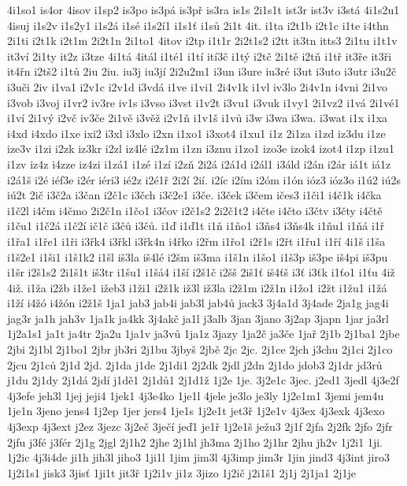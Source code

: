 {4i1so1
is4or
4isov
i1sp2
is3po
is3pá
is3př
is3ra
is1s
2i1s1t
ist3r
ist3v
i3stá
4i1s2u1
4isuj
i1s2v
i1s2y1
i1s2á
i1sé
i1s2í1
i1s1ť
i1sů
2i1t
4it.
i1ta
i2t1b
i2t1c
i1te
i4thn
2i1ti
i2t1k
i2t1m
2i2t1n
2i1to1
4itov
i2tp
i1t1r
2i2t1s2
i2tt
it3tn
itts3
2i1tu
i1t1v
it3ví
2i1ty
it2z
i3tze
4i1tá
4itál
i1té1
i1tí
ití3č
i1tý
i2tč
2i1tě
i2tň
i1tř
it3ře
it3ři
it4řn
i2tš2
i1tů
2iu
2iu.
iu3j
iu3jí
2i2u2m1
i3un
i3ure
iu3ré
i3ut
i3uto
i3utr
i3u2č
i3uči
2iv
i1va1
i2v1c
i2v1d
i3vdá
i1ve
i1vi1
2i4v1k
i1vl
iv3lo
2i4v1n
i4vni
2i1vo
i3vob
i3voj
i1vr2
iv3re
iv1s
i3vso
i3vst
i1v2t
i3vu1
i3vuk
i1vy1
2i1vz2
i1vá
2i1vé1
i1ví
2i1vý
i2vč
iv3če
2i1vě
i3věž
i2v1ň
i1v1š
i1vů
i3w
i3wa
i3wa.
i3wat
i1x
i1xa
i4xd
i4xdo
i1xe
ixi2
i3xl
i3xlo
i2xn
i1xo1
i3xot4
i1xu1
i1z
2i1za
i1zd
iz3du
i1ze
ize3v
i1zi
i2zk
iz3kr
i2zl
iz4lé
i2z1m
i1zn
i3znu
i1zo1
izo3e
izok4
izot4
i1zp
i1zu1
i1zv
iz4z
i4zze
iz4zi
i1zá1
i1zé
i1zí
i2zň
2i2á
i2á1d
i2ál1
i3áld
i2án
i2ár
iá1t
iá1z
i2á1š
i2é
iéf3e
i2ér
iéri3
ié2z
i2é1ř
2i2í
2ií.
i2íc
i2ím
i2óm
i1ón
ióz3
ióz3o
i1ú2
iú2s
iú2t
2ič
i3č2a
i3čan
i2č1c
i3čch
i3č2e1
i3če.
i3ček
i3čem
ičes3
i1či1
i4č1k
i4čka
i1č2l
i4čm
i4čmo
2i2č1n
i1čo1
i3čov
i2č1s2
2i2č1t2
i4čte
i4čto
i3čtv
i3čty
i4čtě
i1ču1
i1č2á
i1č2í
ič1č
i3čů
i3čů.
i1ď
i1ď1t
i1ň
i1ňo1
i3ňs4
i3ňs4k
i1ňu1
i1ňá
i1ř
i1řa1
i1ře1
i1ři
i3řk4
i3řkl
i3řk4n
i4řko
i2řm
i1řo1
i2ř1s
i2řt
i1řu1
i1ří
4i1š
i1ša
i1š2e1
i1ši1
i1š1k2
i1šl
iš3la
iš4lé
i2šm
iš3ma
i1š1n
i1šo1
i1š3p
iš3pe
iš4pi
iš3pu
i1šr
i2š1s2
2i1š1t
iš3tr
i1šu1
i1šá4
i1ší
i2š1č
i2šš
2iš1ť
iš4ťš
i3ť
i3ťk
i1ťo1
i1ťu
4iž
4iž.
i1ža
i2žb
i1že1
ižeb3
i1ži1
i2ž1k
iž3l
iž3la
i2ž1m
i2ž1n
i1žo1
i2žt
i1žu1
i1žá
i1ží
i4žó
i4žón
i2ž1š
1ja1
jab3
jab4i
jab3l
jab4ů
jack3
3j4a1d
3j4ade
2ja1g
jag4i
jag3r
ja1h
jah3v
1ja1k
ja4kk
3j4akč
ja1l
j3alb
3jan
3jano
3j2ap
3japn
1jar
ja3rl
1j2a1s1
ja1t
ja4tr
2ja2u
1ja1v
ja3vů
1ja1z
3jazy
1ja2č
ja3če
1jař
2j1b
2j1ba1
2jbe
2jbi
2j1bl
2j1bo1
2jbr
jb3ri
2j1bu
3jbyš
2jbě
2jc
2jc.
2j1ce
2jch
j3chu
2j1ci
2j1co
2jcu
2j1ců
2j1d
2jd.
2j1da
j1de
2j1di1
2j2dk
2jdl
j2dn
2j1do
jdob3
2j1dr
jd3rů
j1du
2j1dy
2j1dá
2jdí
j1dě1
2j1dů1
2j1d1ž
1j2e
1je.
3j2e1c
3jec.
j2ed1
3jedl
4j3e2f
4j3efe
jeh3l
1jej
jeji4
1jek1
4j3e4ko
1je1l
4jele
je3lo
je3ly
1j2e1m1
3jemi
jem4u
1je1n
3jeno
jens4
1j2ep
1jer
jers4
1je1s
1j2e1t
jet3ř
1j2e1v
4j3ex
4j3exk
4j3exo
4j3exp
4j3ext
j2ez
3jezc
3j2eč
3ječí
jeď1
je1ř
1j2e1š
ježu3
2j1f
2jfa
2j2fk
2jfo
2jfr
2jfu
j3fé
j3fér
2j1g
2jgl
2j1h2
2jhe
2j1hl
jh3ma
2j1ho
2j1hr
2jhu
jh2v
1j2i1
1ji.
1j2ic
4j3i4de
ji1h
jih3l
jiho3
1ji1l
1jim
jim3l
4j3imp
jim3r
1jin
jind3
4j3int
jiro3
1j2i1s1
jisk3
3jisť
1ji1t
jit3ř
1j2i1v
ji1z
3jizo
1j2ič
j2i1š1
2j1j
2j1ja1
2j1je
}
